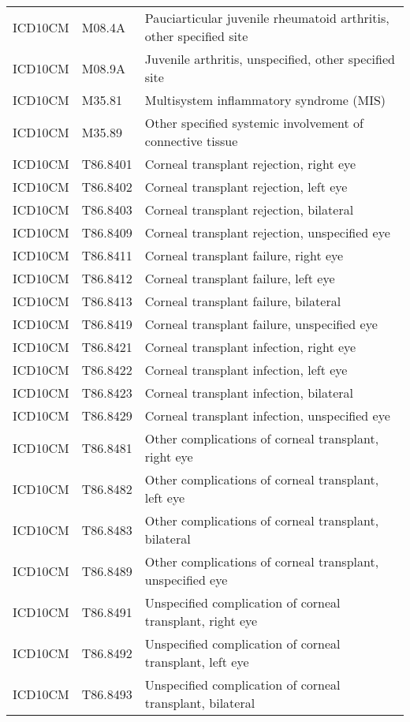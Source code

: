 \begin{longtable}{p{}p{}p{}}
  ICD10CM & M08.4A & Pauciarticular juvenile rheumatoid arthritis, other specified site \\ 
  ICD10CM & M08.9A & Juvenile arthritis, unspecified, other specified site \\ 
  ICD10CM & M35.81 & Multisystem inflammatory syndrome (MIS) \\ 
  ICD10CM & M35.89 & Other specified systemic involvement of connective tissue \\ 
  ICD10CM & T86.8401 & Corneal transplant rejection, right eye \\ 
  ICD10CM & T86.8402 & Corneal transplant rejection, left eye \\ 
  ICD10CM & T86.8403 & Corneal transplant rejection, bilateral \\ 
  ICD10CM & T86.8409 & Corneal transplant rejection, unspecified eye \\ 
  ICD10CM & T86.8411 & Corneal transplant failure, right eye \\ 
  ICD10CM & T86.8412 & Corneal transplant failure, left eye \\ 
  ICD10CM & T86.8413 & Corneal transplant failure, bilateral \\ 
  ICD10CM & T86.8419 & Corneal transplant failure, unspecified eye \\ 
  ICD10CM & T86.8421 & Corneal transplant infection, right eye \\ 
  ICD10CM & T86.8422 & Corneal transplant infection, left eye \\ 
  ICD10CM & T86.8423 & Corneal transplant infection, bilateral \\ 
  ICD10CM & T86.8429 & Corneal transplant infection, unspecified eye \\ 
  ICD10CM & T86.8481 & Other complications of corneal transplant, right eye \\ 
  ICD10CM & T86.8482 & Other complications of corneal transplant, left eye \\ 
  ICD10CM & T86.8483 & Other complications of corneal transplant, bilateral \\ 
  ICD10CM & T86.8489 & Other complications of corneal transplant, unspecified eye \\ 
  ICD10CM & T86.8491 & Unspecified complication of corneal transplant, right eye \\ 
  ICD10CM & T86.8492 & Unspecified complication of corneal transplant, left eye \\ 
  ICD10CM & T86.8493 & Unspecified complication of corneal transplant, bilateral \\ 

\end{longtable}
